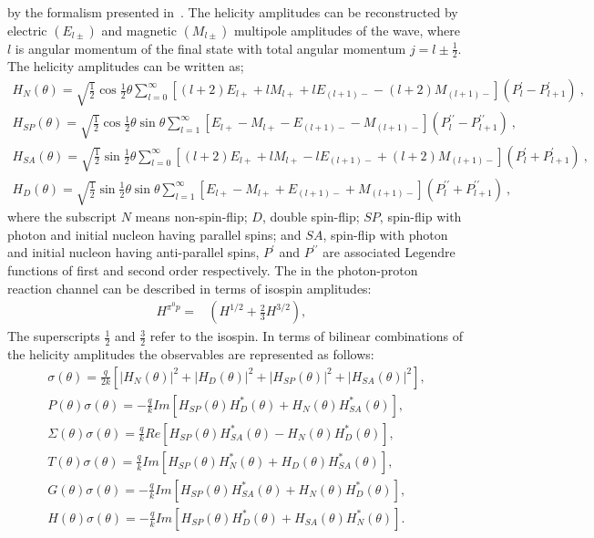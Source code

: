  by the formalism presented in~\cite{ar90}. The helicity amplitudes can be reconstructed by electric $(E_{l\pm})$ and magnetic $(M_{l\pm})$ multipole amplitudes of the \piz wave, where $l$ is angular momentum of the final state with total angular momentum $ j=l\pm \frac{1}{2}$. The helicity amplitudes can be written as; 
%
\begin{align}
H_{N}(\theta) = \sqrt{\frac{1}{2}}\cos\frac{1}{2}\theta \sum_{l=0}^{\infty} {[ (l+2)E_{l+} + lM_{l+} + lE_{(l+1)-} - (l+2)M_{(l+1)-}]( P^{\prime}_{l}-P^{\prime}_{l+1})}  \nonumber \ , \\
%
H_{SP}(\theta) = \sqrt{\frac{1}{2}}\cos\frac{1}{2}\theta \sin \theta \sum_{l=1}^{\infty} {[ E_{l+} - M_{l+} - E_{(l+1)-} - M_{(l+1)-}]( P^{\prime \prime}_{l}-P^{\prime \prime}_{l+1})} \ , \nonumber \\
%
H_{SA}(\theta) = \sqrt{\frac{1}{2}}\sin\frac{1}{2}\theta \sum_{l=0}^{\infty} { [(l+2)E_{l+} + lM_{l+} - lE_{(l+1)-} + (l+2)M_{(l+1)-}]( P^{\prime}_{l}+P^{\prime}_{l+1})} \ ,\nonumber \\
%
H_{D}(\theta) = \sqrt{\frac{1}{2}}\sin\frac{1}{2}\theta \sin \theta \sum_{l=1}^{\infty} {[ E_{l+} - M_{l+} + E_{(l+1)-} + M_{(l+1)-}]( P^{\prime \prime}_{l}+P^{\prime \prime}_{l+1})} \ , 
\end{align}
%
where the subscript $N$ means non-spin-flip; $D$, double spin-flip; $SP$, spin-flip with photon and 
initial nucleon having parallel spins; and $SA$, spin-flip with photon and initial nucleon having 
anti-parallel spins, $P^{\prime}$ and $P^{\prime \prime}$ are associated Legendre functions of
first and second order respectively.
%
The \piz in the photon-proton reaction channel can be described in terms of isospin amplitudes:
%
\begin{align}
	H^{\pi^0p} =& (H^{1/2} + \frac{2}{3}H^{3/2}),&\nonumber
\end{align}
The superscripts $\frac{1}{2}$ and $\frac{3}{2}$ refer to the isospin. In terms of bilinear combinations of the helicity amplitudes the observables are represented as follows:
\begin{align}
	\sigma(\theta) = \frac{q}{2k}[|H_{N}(\theta)|^2 + |H_{D}(\theta)|^2 + |H_{SP}(\theta)|^2 + |H_{SA}(\theta)|^2],\nonumber\\
	P(\theta)\sigma(\theta) = -\frac{q}{k}Im[H_{SP}(\theta)H_{D}^*(\theta) + H_{N}(\theta)H^*_{SA}(\theta)],\nonumber\\
	\Sigma(\theta)\sigma(\theta) = \frac{q}{k}Re[H_{SP}(\theta)H_{SA}^*(\theta) - H_{N}(\theta)H^*_{D}(\theta)],\nonumber\\
	T(\theta)\sigma(\theta) = \frac{q}{k}Im[H_{SP}(\theta)H_{N}^*(\theta) + H_{D}(\theta)H^*_{SA}(\theta)],\nonumber\\
	G(\theta)\sigma(\theta) = -\frac{q}{k}Im[H_{SP}(\theta)H_{SA}^*(\theta) + H_{N}(\theta)H^*_{D}(\theta)],\nonumber\\
	H(\theta)\sigma(\theta) = -\frac{q}{k}Im[H_{SP}(\theta)H_{D}^*(\theta) + H_{SA}(\theta)H^*_{N}(\theta)].
\end{align}

